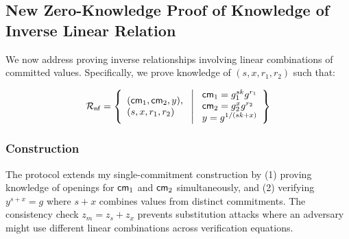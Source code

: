 \subsection{New Zero-Knowledge Proof of Knowledge of Inverse Linear Relation}\label{sec-pok-committed-inv-linear-relation}

We now address proving inverse relationships involving linear combinations of committed values. Specifically, we prove knowledge of $(s, x, r_1, r_2)$ such that:

\[
\mathcal{R}_{\mathsf{nf}} = \left\{ 
\begin{array}{l} (\mathsf{cm}_1, \mathsf{cm}_2, y),\\
(s, x, r_1, r_2) 
\end{array}
\ \middle|
\ \begin{array}{l}
\mathsf{cm}_1 = g_1^{sk} g^{r_1} \\
\mathsf{cm}_2 = g_2^{x} g^{r_2} \\
y = g^{1/(sk + x)} \\
\end{array} \right\}
\]






\subsubsection{Construction}
The protocol extends my single-commitment construction by (1) proving knowledge of openings for $\mathsf{cm}_1$ and $\mathsf{cm}_2$ simultaneously, and (2) verifying $y^{s+x} = g$ where $s+x$ combines values from distinct commitments. The consistency check $z_m = z_{s} + z_x$ prevents substitution attacks where an adversary might use different linear combinations across verification equations.


